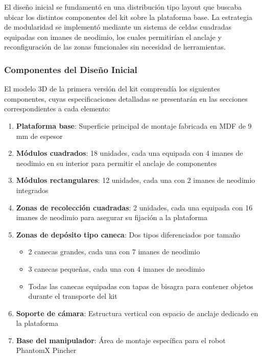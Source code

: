 El diseño inicial se fundamentó en una distribución tipo layout que buscaba ubicar los distintos componentes del kit sobre la plataforma base. La estrategia de modularidad se implementó mediante un sistema de celdas cuadradas equipadas con imanes de neodimio, los cuales permitirían el anclaje y reconfiguración de las zonas funcionales sin necesidad de herramientas.

\subsubsection{Componentes del Diseño Inicial}

El modelo 3D de la primera versión del kit comprendía los siguientes componentes, cuyas especificaciones detalladas se presentarán en las secciones correspondientes a cada elemento:

\begin{enumerate}
    \item \textbf{Plataforma base}: Superficie principal de montaje fabricada en MDF de 9 mm de espesor
    
    \item \textbf{Módulos cuadrados}: 18 unidades, cada una equipada con 4 imanes de neodimio en su interior para permitir el anclaje de componentes
    
    \item \textbf{Módulos rectangulares}: 12 unidades, cada una con 2 imanes de neodimio integrados
    
    \item \textbf{Zonas de recolección cuadradas}: 2 unidades, cada una equipada con 16 imanes de neodimio para asegurar su fijación a la plataforma
    
    \item \textbf{Zonas de depósito tipo caneca}: Dos tipos diferenciados por tamaño
    \begin{itemize}
        \item 2 canecas grandes, cada una con 7 imanes de neodimio
        \item 3 canecas pequeñas, cada una con 4 imanes de neodimio
        \item Todas las canecas equipadas con tapas de bisagra para contener objetos durante el transporte del kit
    \end{itemize}
    
    \item \textbf{Soporte de cámara}: Estructura vertical con espacio de anclaje dedicado en la plataforma
    
    \item \textbf{Base del manipulador}: Área de montaje específica para el robot PhantomX Pincher
\end{enumerate}

